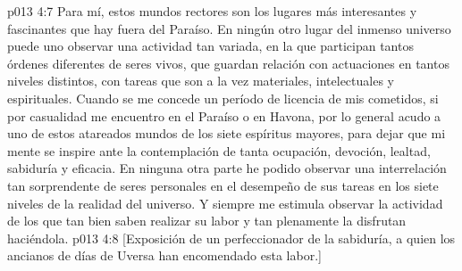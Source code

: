 \vs p013 4:7 Para mí, estos mundos rectores son los lugares más interesantes y fascinantes que hay fuera del Paraíso. En ningún otro lugar del inmenso universo puede uno observar una actividad tan variada, en la que participan tantos órdenes diferentes de seres vivos, que guardan relación con actuaciones en tantos niveles distintos, con tareas que son a la vez materiales, intelectuales y espirituales. Cuando se me concede un período de licencia de mis cometidos, si por casualidad me encuentro en el Paraíso o en Havona, por lo general acudo a uno de estos atareados mundos de los siete espíritus mayores, para dejar que mi mente se inspire ante la contemplación de tanta ocupación, devoción, lealtad, sabiduría y eficacia. En ninguna otra parte he podido observar una interrelación tan sorprendente de seres personales en el desempeño de sus tareas en los siete niveles de la realidad del universo. Y siempre me estimula observar la actividad de los que tan bien saben realizar su labor y tan plenamente la disfrutan haciéndola.
\vsetoff
\vs p013 4:8 [Exposición de un perfeccionador de la sabiduría, a quien los ancianos de días de Uversa han encomendado esta labor.]

